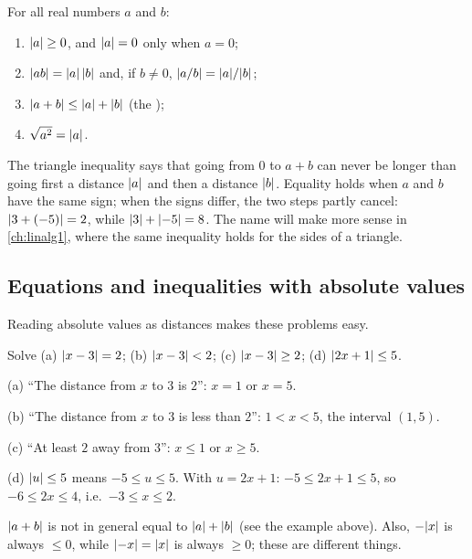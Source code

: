 \begin{proposition}\label{prop:abs-properties}
For all real numbers $a$ and $b$:
\begin{enumerate}
  \item $\lvert a\rvert \ge 0$, and $\lvert a\rvert = 0$ only when $a = 0$;
  \item $\lvert ab\rvert = \lvert a\rvert\,\lvert b\rvert$ and, if $b \neq 0$,
    $\lvert a/b\rvert = \lvert a\rvert/\lvert b\rvert$;
  \item $\lvert a + b\rvert \le \lvert a\rvert + \lvert b\rvert$ (the );
  \item $\sqrt{a^2} = \lvert a\rvert$.
\end{enumerate}
\end{proposition}

The triangle inequality says that going from $0$ to $a + b$ can never be
longer than going first a distance $\lvert a\rvert$ and then a distance $\lvert b\rvert$.
Equality holds when $a$ and $b$ have the same sign; when the signs differ, the
two steps partly cancel: $\lvert3 + (-5)\rvert = 2$, while $\lvert3\rvert + \lvert-5\rvert = 8$.
The name will make more sense in \cref{ch:linalg1}, where the same inequality
holds for the sides of a triangle.

\subsection{Equations and inequalities with absolute values}

Reading absolute values as distances makes these problems easy.

\begin{example}
\label{ex:abs-equations}
Solve (a) $\lvert x - 3\rvert = 2$; (b) $\lvert x - 3\rvert < 2$; (c) $\lvert x-3\rvert \ge 2$;
(d) $\lvert2x + 1\rvert \le 5$.

\sol (a) ``The distance from $x$ to $3$ is $2$'': $x = 1$ or $x = 5$.

(b) ``The distance from $x$ to $3$ is less than $2$'': $1 < x < 5$, the
interval $(1, 5)$.

(c) ``At least $2$ away from $3$'': $x \le 1$ or $x \ge 5$.

(d) $\lvert u\rvert \le 5$ means $-5 \le u \le 5$. With $u = 2x + 1$:
$-5 \le 2x + 1 \le 5$, so $-6 \le 2x \le 4$, i.e.\ $-3 \le x \le 2$.
\end{example}

\begin{pitfall}
$\lvert a + b\rvert$ is not in general equal to $\lvert a\rvert + \lvert b\rvert$ (see the example
above). Also, $-\lvert x\rvert$ is always $\le 0$, while $\lvert-x\rvert = \lvert x\rvert$ is
always $\ge 0$; these are different things.
\end{pitfall}

